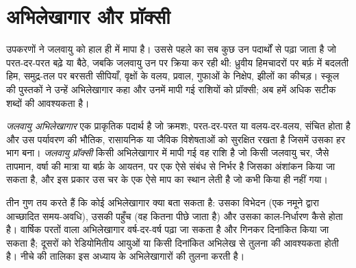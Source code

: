 \section{अभिलेखागार और प्रॉक्सी}\label{sec:b2:climate-proxies:archives}

उपकरणों ने जलवायु को हाल ही में मापा है। उससे पहले का सब कुछ उन पदार्थों से पढ़ा जाता है जो
परत-दर-परत बढ़े या बैठे, जबकि जलवायु उन पर क्रिया कर रही थी: ध्रुवीय हिमचादरों पर बर्फ़ में बदलती
हिम, समुद्र-तल पर बरसती सीपियाँ, वृक्षों के वलय, प्रवाल, गुफाओं के निक्षेप, झीलों का कीचड़। स्कूल की
पुस्तकों ने उन्हें अभिलेखागार कहा और उनमें मापी गई राशियों को प्रॉक्सी; अब हमें अधिक सटीक
शब्दों की आवश्यकता है।

\begin{definition}\label{def:b2:climate-proxies:proxy}
\emph{जलवायु अभिलेखागार} एक प्राकृतिक पदार्थ है जो
क्रमशः, परत-दर-परत या वलय-दर-वलय, संचित होता है और उस पर्यावरण की भौतिक, रासायनिक या जैविक
विशेषताओं को सुरक्षित रखता है जिसमें उसका हर भाग बना। \emph{जलवायु
प्रॉक्सी} किसी अभिलेखागार में मापी गई वह राशि है जो किसी जलवायु
चर, जैसे तापमान, वर्षा की मात्रा या बर्फ़ के आयतन, पर एक ऐसे संबंध से निर्भर है जिसका अंशांकन
किया जा सकता है, और इस प्रकार उस चर के एक ऐसे माप का स्थान लेती है जो कभी किया ही नहीं गया।
\end{definition}

तीन गुण तय करते हैं कि कोई अभिलेखागार क्या बता सकता है: उसका विभेदन (एक नमूने द्वारा आच्छादित
समय-अवधि), उसकी पहुँच (वह कितना पीछे जाता है) और उसका काल-निर्धारण कैसे होता है। वार्षिक परतों वाला अभिलेखागार
वर्ष-दर-वर्ष पढ़ा जा सकता है और गिनकर दिनांकित किया जा सकता है; दूसरों को रेडियोमितीय आयुओं या किसी
दिनांकित अभिलेख से तुलना की आवश्यकता होती है। नीचे की तालिका इस अध्याय के अभिलेखागारों की तुलना करती है।

